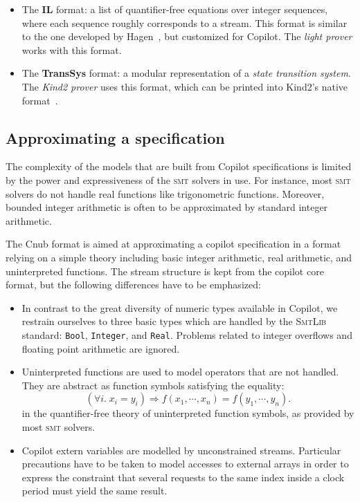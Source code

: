 \begin{itemize}
\item
  The \textbf{IL} format: a list
  of quantifier-free equations over integer sequences, where each sequence
  roughly corresponds to a stream.   This
format is similar to the one developed by Hagen~\cite{HagenPhD}, but customized for Copilot.   The \emph{light prover} works with this
  format.
\item The \textbf{TransSys} format: a modular representation of a
  \emph{state transition system}. The \emph{Kind2 prover} uses this
  format, which can be printed into Kind2's native format~\cite{kind}.
\end{itemize}

\subsection{Approximating a specification}

The complexity of the models that are built from Copilot specifications is
limited by the power and expressiveness of the \textsc{smt} solvers in use. For instance,
most \textsc{smt} solvers do not handle real functions like trigonometric functions. Moreover, bounded integer arithmetic is often to be approximated by standard integer arithmetic.

The {Cnub} format is aimed at approximating a copilot specification in a format relying on a simple theory including basic integer arithmetic, real arithmetic, and uninterpreted functions. The stream structure is kept from the copilot core format, but the following differences have to be emphasized:

\begin{itemize}
\item In contrast to the great diversity of numeric types available in Copilot, we restrain ourselves to three basic types which are handled by the \textsc{SmtLib} standard: \texttt{Bool}, \texttt{Integer}, and \texttt{Real}. Problems related to integer overflows and floating point arithmetic are ignored.



\item {Uninterpreted functions} are used to model operators that are not
  handled. They are abstract as function symbols satisfying the
  equality: $$ \left( \forall i . \; x_i = y_i \right) \Longrightarrow f(x_1,
  \cdots, x_n) = f(y_1, \cdots, y_n). $$ in the quantifier-free theory of
  uninterpreted function symbols, as provided by most \textsc{smt} solvers.

\item Copilot extern variables are modelled by unconstrained streams. Particular precautions have to be taken to model accesses to external arrays in order to express the constraint that several requests to the same index inside a clock period must yield the same result.

\end{itemize}

